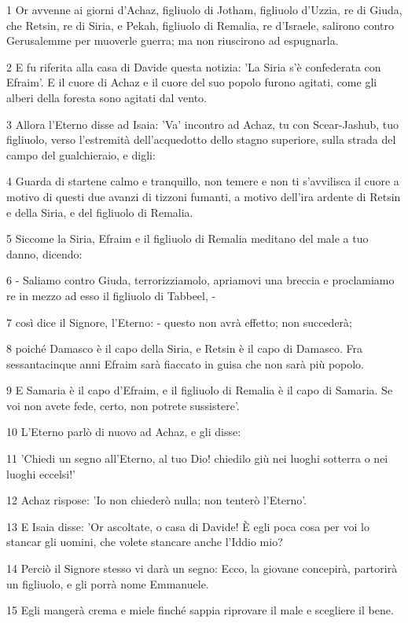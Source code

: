 \par 1 Or avvenne ai giorni d'Achaz, figliuolo di Jotham, figliuolo d'Uzzia, re di Giuda, che Retsin, re di Siria, e Pekah, figliuolo di Remalia, re d'Israele, salirono contro Gerusalemme per muoverle guerra; ma non riuscirono ad espugnarla.
\par 2 E fu riferita alla casa di Davide questa notizia: 'La Siria s'è confederata con Efraim'. E il cuore di Achaz e il cuore del suo popolo furono agitati, come gli alberi della foresta sono agitati dal vento.
\par 3 Allora l'Eterno disse ad Isaia: 'Va' incontro ad Achaz, tu con Scear-Jashub, tuo figliuolo, verso l'estremità dell'acquedotto dello stagno superiore, sulla strada del campo del gualchieraio, e digli:
\par 4 Guarda di startene calmo e tranquillo, non temere e non ti s'avvilisca il cuore a motivo di questi due avanzi di tizzoni fumanti, a motivo dell'ira ardente di Retsin e della Siria, e del figliuolo di Remalia.
\par 5 Siccome la Siria, Efraim e il figliuolo di Remalia meditano del male a tuo danno, dicendo:
\par 6 - Saliamo contro Giuda, terrorizziamolo, apriamovi una breccia e proclamiamo re in mezzo ad esso il figliuolo di Tabbeel, -
\par 7 così dice il Signore, l'Eterno: - questo non avrà effetto; non succederà;
\par 8 poiché Damasco è il capo della Siria, e Retsin è il capo di Damasco. Fra sessantacinque anni Efraim sarà fiaccato in guisa che non sarà più popolo.
\par 9 E Samaria è il capo d'Efraim, e il figliuolo di Remalia è il capo di Samaria. Se voi non avete fede, certo, non potrete sussistere'.
\par 10 L'Eterno parlò di nuovo ad Achaz, e gli disse:
\par 11 'Chiedi un segno all'Eterno, al tuo Dio! chiedilo giù nei luoghi sotterra o nei luoghi eccelsi!'
\par 12 Achaz rispose: 'Io non chiederò nulla; non tenterò l'Eterno'.
\par 13 E Isaia disse: 'Or ascoltate, o casa di Davide! È egli poca cosa per voi lo stancar gli uomini, che volete stancare anche l'Iddio mio?
\par 14 Perciò il Signore stesso vi darà un segno: Ecco, la giovane concepirà, partorirà un figliuolo, e gli porrà nome Emmanuele.
\par 15 Egli mangerà crema e miele finché sappia riprovare il male e scegliere il bene.
